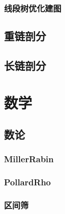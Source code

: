 \documentclass{article}
\begin{document}
\begin{multicols*}{2}
\subsubsection{线段树优化建图}
\begin{small}

\end{small}

\subsection{重链剖分}
\begin{small}

\end{small}

\subsection{长链剖分}

\section{数学}
\subsection{数论}
\subsubsection{MillerRabin}
\begin{small}

\end{small}

\subsubsection{PollardRho}
\begin{small}

\end{small}

\subsubsection{区间筛}
\begin{small}

\end{small}


\end{multicols*}
\end{document}
